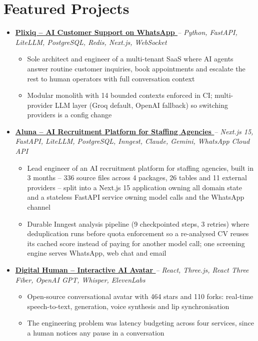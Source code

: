 \documentclass[letterpaper,10pt]{article}
\newcommand{\normalfaExternalLink}{{\mdseries\faExternalLink}}
\begin{document}
\section{Featured Projects}
\begin{itemize}[leftmargin=*, itemsep=2pt]
    \item \textbf{\href{https://plixiq.com}{Plixiq -- AI Customer Support on WhatsApp \normalfaExternalLink}} \textit{-- Python, FastAPI, LiteLLM, PostgreSQL, Redis, Next.js, WebSocket}
    \begin{itemize}[itemsep=0pt]
        \item Sole architect and engineer of a multi-tenant SaaS where AI agents answer routine customer inquiries, book appointments and escalate the rest to human operators with full conversation context
        \item Modular monolith with 14 bounded contexts enforced in CI; multi-provider LLM layer (Groq default, OpenAI fallback) so switching providers is a config change
    \end{itemize}
    \item \textbf{\href{https://www.aluna.works}{Aluna -- AI Recruitment Platform for Staffing Agencies \normalfaExternalLink}} \textit{-- Next.js 15, FastAPI, LiteLLM, PostgreSQL, Inngest, Claude, Gemini, WhatsApp Cloud API}
    \begin{itemize}[itemsep=0pt]
        \item Lead engineer of an AI recruitment platform for staffing agencies, built in 3 months -- 336 source files across 4 packages, 26 tables and 11 external providers -- split into a Next.js 15 application owning all domain state and a stateless FastAPI service owning model calls and the WhatsApp channel
        \item Durable Inngest analysis pipeline (9 checkpointed steps, 3 retries) where deduplication runs before quota enforcement so a re-analysed CV reuses its cached score instead of paying for another model call; one screening engine serves WhatsApp, web chat and email
    \end{itemize}
    \item \textbf{\href{https://github.com/asanchezyali/talking-avatar-with-ai}{Digital Human -- Interactive AI Avatar \normalfaExternalLink}} \textit{-- React, Three.js, React Three Fiber, OpenAI GPT, Whisper, ElevenLabs}
    \begin{itemize}[itemsep=0pt]
        \item Open-source conversational avatar with 464 stars and 110 forks: real-time speech-to-text, generation, voice synthesis and lip synchronisation
        \item The engineering problem was latency budgeting across four services, since a human notices any pause in a conversation
    \end{itemize}
\end{itemize}
\end{document}
